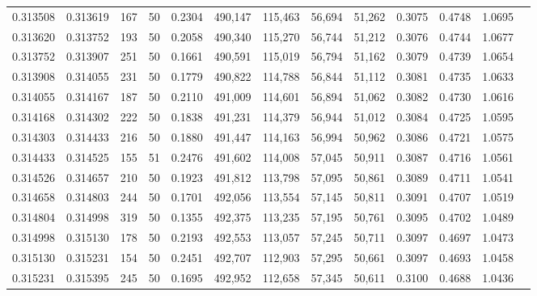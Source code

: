 \begin{tabular}{rrrrrrrrrrrrr}
0.313508 & 0.313619 &   167 &  50 &                                     0.2304 & 490,147 & 115,463 &  56,694 &  51,262 & 0.3075 & 0.4748 & 1.0695 \\
0.313620 & 0.313752 &   193 &  50 &                                     0.2058 & 490,340 & 115,270 &  56,744 &  51,212 & 0.3076 & 0.4744 & 1.0677 \\
0.313752 & 0.313907 &   251 &  50 &                                     0.1661 & 490,591 & 115,019 &  56,794 &  51,162 & 0.3079 & 0.4739 & 1.0654 \\
0.313908 & 0.314055 &   231 &  50 &                                     0.1779 & 490,822 & 114,788 &  56,844 &  51,112 & 0.3081 & 0.4735 & 1.0633 \\
0.314055 & 0.314167 &   187 &  50 &                                     0.2110 & 491,009 & 114,601 &  56,894 &  51,062 & 0.3082 & 0.4730 & 1.0616 \\
0.314168 & 0.314302 &   222 &  50 &                                     0.1838 & 491,231 & 114,379 &  56,944 &  51,012 & 0.3084 & 0.4725 & 1.0595 \\
0.314303 & 0.314433 &   216 &  50 &                                     0.1880 & 491,447 & 114,163 &  56,994 &  50,962 & 0.3086 & 0.4721 & 1.0575 \\
0.314433 & 0.314525 &   155 &  51 &                                     0.2476 & 491,602 & 114,008 &  57,045 &  50,911 & 0.3087 & 0.4716 & 1.0561 \\
0.314526 & 0.314657 &   210 &  50 &                                     0.1923 & 491,812 & 113,798 &  57,095 &  50,861 & 0.3089 & 0.4711 & 1.0541 \\
0.314658 & 0.314803 &   244 &  50 &                                     0.1701 & 492,056 & 113,554 &  57,145 &  50,811 & 0.3091 & 0.4707 & 1.0519 \\
0.314804 & 0.314998 &   319 &  50 &                                     0.1355 & 492,375 & 113,235 &  57,195 &  50,761 & 0.3095 & 0.4702 & 1.0489 \\
0.314998 & 0.315130 &   178 &  50 &                                     0.2193 & 492,553 & 113,057 &  57,245 &  50,711 & 0.3097 & 0.4697 & 1.0473 \\
0.315130 & 0.315231 &   154 &  50 &                                     0.2451 & 492,707 & 112,903 &  57,295 &  50,661 & 0.3097 & 0.4693 & 1.0458 \\
0.315231 & 0.315395 &   245 &  50 &                                     0.1695 & 492,952 & 112,658 &  57,345 &  50,611 & 0.3100 & 0.4688 & 1.0436 \\

\end{tabular}

